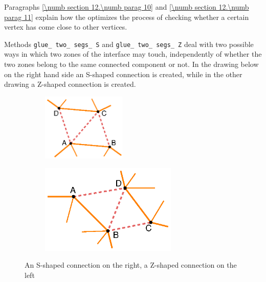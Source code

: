 Paragraphs \ref{\numb section 12.\numb parag 10} and \ref{\numb section 12.\numb parag 11}
explain how the {\small\tt{}} optimizes the process of checking whether a
certain vertex has come close to other vertices.

Methods {\small\tt glue\_\,two\_\,segs\_\,S} and
{\small\tt glue\_\,two\_\,segs\_\,Z} deal with two possible ways in which two
zones of the interface may touch,
independently of whether the two zones belong to the same connected component or not.
In the drawing below on the right hand side an S-shaped connection is created,
while in the other drawing a Z-shaped connection is created.

\begin{figure}[ht] \centering
\begin{subfigure}{45mm}\centering
  \includegraphics[width=40mm]{connect-S}
\end{subfigure}  
\begin{subfigure}{70mm}\centering
  \includegraphics[width=65mm]{connect-Z}
\end{subfigure}  
  \caption{An S-shaped connection on the right, a Z-shaped connection on the left}
  \label{\numb section 12.\numb fig 7}
\end{figure}


\section{~~\cinza{[empty]}}\label{\numb section 12.\numb parag 9}


